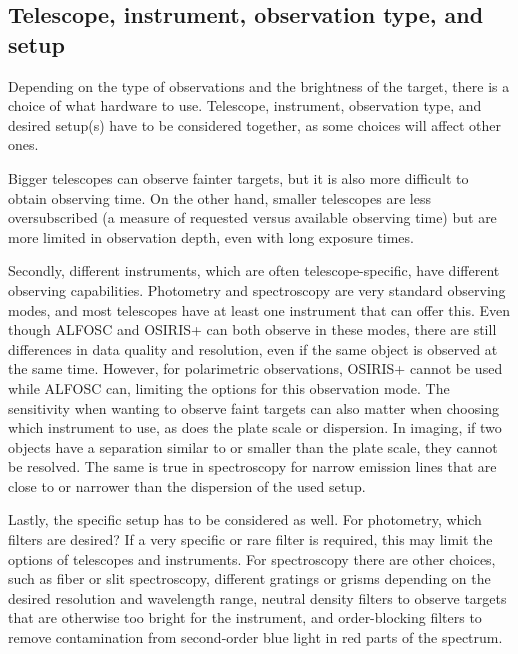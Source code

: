 \documentclass[a4paper,oneside,12pt, class=Latex/Classes/PhDthesisPSnPDF, crop=false]{standalone}
\begin{document}
\subsection{Telescope, instrument, observation type, and setup}
Depending on the type of observations and the brightness of the target, there is a choice of what hardware to use. Telescope, instrument, observation type, and desired setup(s) have to be considered together, as some choices will affect other ones.

Bigger telescopes can observe fainter targets, but it is also more difficult to obtain observing time. On the other hand, smaller telescopes are less oversubscribed (a measure of requested versus available observing time) but are more limited in observation depth, even with long exposure times.

Secondly, different instruments, which are often telescope-specific, have different observing capabilities. Photometry and spectroscopy are very standard observing modes, and most telescopes have at least one instrument that can offer this. Even though ALFOSC and OSIRIS+ can both observe in these modes, there are still differences in data quality and resolution, even if the same object is observed at the same time. However, for polarimetric observations, OSIRIS+ cannot be used while ALFOSC can, limiting the options for this observation mode. The sensitivity when wanting to observe faint targets can also matter when choosing which instrument to use, as does the plate scale or dispersion. In imaging, if two objects have a separation similar to or smaller than the plate scale, they cannot be resolved. The same is true in spectroscopy for narrow emission lines that are close to or narrower than the dispersion of the used setup.

Lastly, the specific setup has to be considered as well. For photometry, which filters are desired? If a very specific or rare filter is required, this may limit the options of telescopes and instruments. For spectroscopy there are other choices, such as fiber or slit spectroscopy, different gratings or grisms depending on the desired resolution and wavelength range, neutral density filters to observe targets that are otherwise too bright for the instrument, and order-blocking filters to remove contamination from second-order blue light in red parts of the spectrum.
\end{document}
